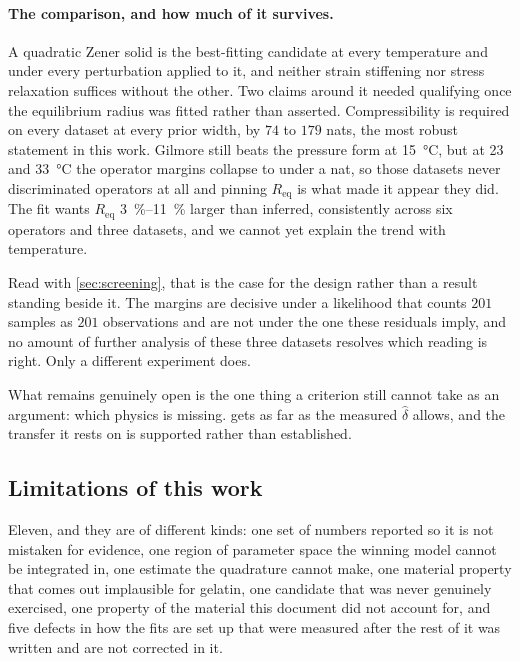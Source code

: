 \documentclass[10pt]{article}
\begin{document}
\paragraph{The comparison, and how much of it survives.} A quadratic Zener solid is the
best-fitting candidate at every temperature and under every perturbation applied to it, and
neither strain stiffening nor stress relaxation suffices without the other. Two claims around it
needed qualifying once the equilibrium radius was fitted rather than asserted. Compressibility is
required on every dataset at every prior width, by $74$ to $179$ nats, the most robust
statement in this work. Gilmore still beats the pressure form at \SI{15}{\celsius}, but at
\SI{23}{} and \SI{33}{\celsius} the operator margins collapse to under a nat, so those datasets
never discriminated operators at all and pinning $R_{\mathrm{eq}}$ is what made it appear they
did. The fit wants $R_{\mathrm{eq}}$ \SIrange{3}{11}{\percent} larger than inferred, consistently
across six operators and three datasets, and we cannot yet explain the trend with temperature.

Read with \cref{sec:screening}, that is the case for the design rather than a result standing
beside it. The margins are decisive under a likelihood that counts $201$ samples as $201$
observations and are not under the one these residuals imply, and no amount of further analysis
of these three datasets resolves which reading is right. Only a different experiment does.

What remains genuinely open is the one thing a criterion still cannot take as an argument: which
physics is missing.  gets as far as the measured $\hat\delta$ allows, and
the transfer it rests on is supported rather than established.

\subsection{Limitations of this work}
\label{sec:limitations}

Eleven, and they are of different kinds: one set of numbers reported so it is not mistaken for
evidence, one region of parameter space the winning model cannot be integrated in, one estimate
the quadrature cannot make, one material property that comes out implausible for gelatin, one
candidate that was never genuinely exercised, one property of the material this document did not
account for, and five defects in how the fits are set up that were measured after the rest of it
was written and are not corrected in it.
\end{document}
